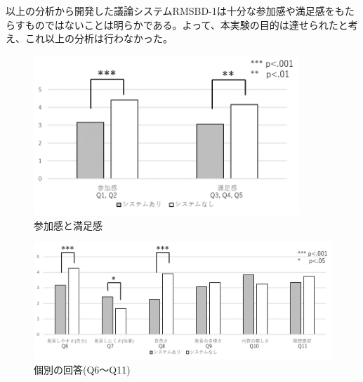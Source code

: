 \documentclass[11pt, a4paper]{jreport} %
\begin{document}
以上の分析から開発した議論システムRMSBD-1は十分な参加感や満足感をもたらすものではないことは明らかである。よって、本実験の目的は達せられたと考え、これ以上の分析は行わなかった。

\begin{figure}[htbp]
\begin{center}
\includegraphics[width=100mm]{images/jikken1_manzoku.png}
\caption{参加感と満足感}
\label{fig:jikken1_sat}
\end{center}
\end{figure}

\begin{figure}[htbp]
\begin{center}
\includegraphics[width=150mm]{images/jikken1_kobetu}
\caption{個別の回答(Q6～Q11)}
\label{fig:jikken1_kobetu}
\end{center}
\end{figure}
\end{document}
